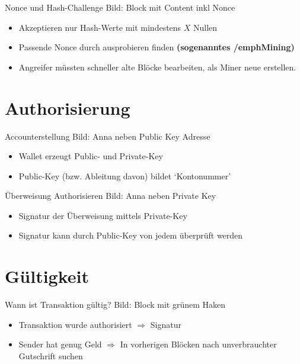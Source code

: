 \documentclass[aspectratio=169]{beamer}
\begin{document}
\begin{frame}{Nonce und Hash-Challenge}
    Bild: Block mit Content inkl Nonce
    \begin{itemize}
        \item Akzeptieren nur Hash-Werte mit mindestens $X$ Nullen
        \item Passende Nonce durch ausprobieren finden \textbf{(sogenanntes /emph{Mining})}
        \item Angreifer müssten schneller alte Blöcke bearbeiten, als Miner neue erstellen.
    \end{itemize}
\end{frame}






\section{Authorisierung}

\begin{frame}{Accounterstellung}
    Bild: Anna neben Public Key Adresse
    \begin{itemize}
        \item Wallet erzeugt Public- und Private-Key
        \item Public-Key (bzw. Ableitung davon) bildet `Kontonummer'
    \end{itemize}
\end{frame}


\begin{frame}{Überweisung Authorisieren}
    Bild: Anna neben Private Key
    \begin{itemize}
        \item Signatur der Überweisung mittels Private-Key
        \item Signatur kann durch Public-Key von jedem überprüft werden
    \end{itemize}
\end{frame}





\section{Gültigkeit}

\begin{frame}{Wann ist Transaktion gültig?}
    Bild: Block mit grünem Haken
    \begin{itemize}
        \item Transaktion wurde authorisiert $\Rightarrow$ Signatur
        \item Sender hat genug Geld $\Rightarrow$ In vorherigen Blöcken nach unverbrauchter Gutschrift suchen
    \end{itemize}
\end{frame}
\end{document}
